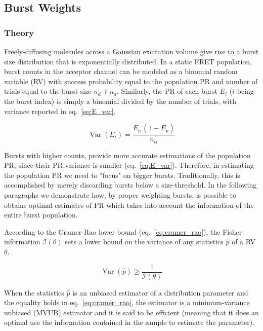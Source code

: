 \subsection{Burst Weights}
\label{sec:burstweights_theory}
\subsubsection{Theory}
Freely-diffusing molecules across 
a Gaussian excitation volume give rise to 
a burst size distribution that is exponentially distributed.
In a static FRET population, burst counts in the acceptor channel can be
modeled as a binomial random variable (RV) with success probability equal to the
population PR and number of trials equal to the burst size $n_d + n_a$.
Similarly, the PR of each burst $E_i$ ($i$ being the burst index) is 
simply a binomial divided by the number of trials, with variance reported
in eq.~\ref{eq:E_var}.

\begin{equation}
\label{eq:E_var}
\operatorname{Var} (E_i) = \frac{E_p\,(1 - E_p)}{n_{ti}}
\end{equation}

Bursts with higher counts, provide more accurate estimations 
of the population PR, since their PR variance is smaller (eq.~\ref{eq:E_var}). 
Therefore, in estimating the population PR we need to "focus" 
on bigger bursts.
Traditionally, this is accomplished by merely discarding bursts
below a size-threshold.
In the following paragraphs we demonstrate how, by proper weighting
bursts, is possible to obtains optimal estimates of PR which takes into 
account the information of the entire burst population.

According to the Cramer-Rao lower bound (eq.~\ref{eq:cramer_rao}), the 
Fisher information $\mathcal{I}(\theta)$ sets a lower bound on the
variance of any statistics $\hat{p}$ of a RV $\theta$.

\begin{equation}
\label{eq:cramer_rao}
\operatorname{Var}\left(\hat{p}\right) \ge \frac{1}{\mathcal{I}(\theta)}
\end{equation}

When the statistics $\hat{p}$ is an unbiased estimator of a distribution 
parameter and the equality holds in eq.~\ref{eq:cramer_rao},
the estimator is a minimum-variance unbiased (MVUB) estimator 
and it is said to be efficient (meaning that it does an
optimal use the information contained in the sample to estimate the
parameter).


